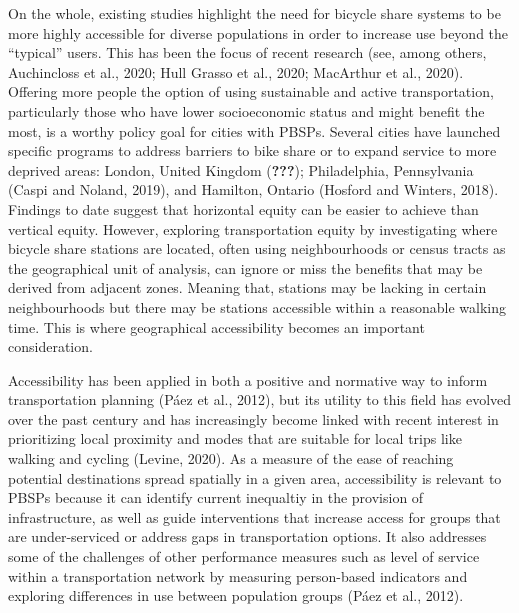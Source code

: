 \documentclass[]{elsarticle} %
\begin{document}
On the whole, existing studies highlight the need for bicycle share
systems to be more highly accessible for diverse populations in order to
increase use beyond the ``typical'' users. This has been the focus of
recent research (see, among others, Auchincloss et al., 2020; Hull
Grasso et al., 2020; MacArthur et al., 2020). Offering more people the
option of using sustainable and active transportation, particularly
those who have lower socioeconomic status and might benefit the most, is
a worthy policy goal for cities with PBSPs. Several cities have launched
specific programs to address barriers to bike share or to expand service
to more deprived areas: London, United Kingdom ({\textbf{???}});
Philadelphia, Pennsylvania (Caspi and Noland, 2019), and Hamilton,
Ontario (Hosford and Winters, 2018). Findings to date suggest that
horizontal equity can be easier to achieve than vertical equity.
However, exploring transportation equity by investigating where bicycle
share stations are located, often using neighbourhoods or census tracts
as the geographical unit of analysis, can ignore or miss the benefits
that may be derived from adjacent zones. Meaning that, stations may be
lacking in certain neighbourhoods but there may be stations accessible
within a reasonable walking time. This is where geographical
accessibility becomes an important consideration.

Accessibility has been applied in both a positive and normative way to
inform transportation planning (Páez et al., 2012), but its utility to
this field has evolved over the past century and has increasingly become
linked with recent interest in prioritizing local proximity and modes
that are suitable for local trips like walking and cycling (Levine,
2020). As a measure of the ease of reaching potential destinations
spread spatially in a given area, accessibility is relevant to PBSPs
because it can identify current inequaltiy in the provision of
infrastructure, as well as guide interventions that increase access for
groups that are under-serviced or address gaps in transportation
options. It also addresses some of the challenges of other performance
measures such as level of service within a transportation network by
measuring person-based indicators and exploring differences in use
between population groups (Páez et al., 2012).
\end{document}
